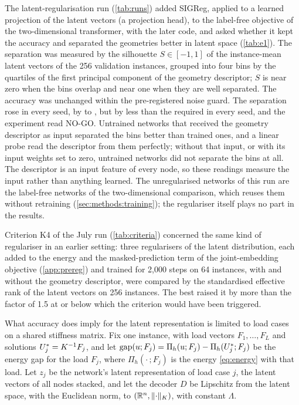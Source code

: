 The latent-regularisation run (\cref{tab:runs}) added SIGReg, applied to a learned
projection of the latent vectors (a projection head), to the label-free objective of the
two-dimensional transformer, with the later code, and asked whether it kept the accuracy and
separated the geometries better in latent space (\cref{tab:e1}). The separation was measured
by the silhouette $S\in[-1,1]$ of the instance-mean latent vectors of the 256 validation
instances, grouped into four bins by the quartiles of the first principal component of the
geometry descriptor; $S$ is near zero when the bins overlap and near one when they are well
separated. The accuracy was unchanged within the pre-registered noise guard. The separation
rose in every seed, by \numEOneDeltaMin{} to \numEOneDeltaMax{}, but by less than the
\numEOneFloor{} required in every seed, and the experiment read NO-GO. Untrained networks
that received the geometry descriptor as input separated the bins better than trained
ones, and a linear probe read the descriptor from them perfectly; without that input, or
with its input weights set to zero, untrained networks did not separate the bins at all.
The descriptor is an input feature of every node, so these readings measure the input
rather than anything learned. The unregularised networks of this run are the label-free
networks of the two-dimensional comparison, which reuses them without retraining
(\cref{sec:methods:training}); the regulariser itself plays no part in the results.

Criterion K4 of the July run (\cref{tab:criteria}) concerned the same kind of regulariser
in an earlier setting: three regularisers of the latent distribution, each added to the
energy and the masked-prediction term of the joint-embedding objective (\ref{app:prereg})
and trained for 2,000 steps on 64 instances, with and without the geometry descriptor, were
compared by the standardised effective rank of the latent vectors on 256 instances. The
best raised it by more than the factor of 1.5 at or below which the criterion would have
been triggered.

What accuracy does imply for the latent representation is limited to load cases on a
shared stiffness matrix. Fix one instance, with load vectors $F_1,\dots,F_L$ and solutions
$U^{\ast}_j=K^{-1}F_j$, and let $\operatorname{gap}(u;F_j)=\Pi_h(u;F_j)-\Pi_h(U^{\ast}_j;F_j)$ be the energy
gap for the load $F_j$, where $\Pi_h(\cdot\,;F_j)$ is the energy \eqref{eq:energy} with that
load. Let $z_j$ be the network's latent representation of load case $j$, the latent vectors
of all nodes stacked, and let the decoder $D$ be Lipschitz from the latent space, with the
Euclidean norm, to $(\mathbb{R}^{n},\lVert \cdot\rVert_K)$, with constant $\Lambda$.

